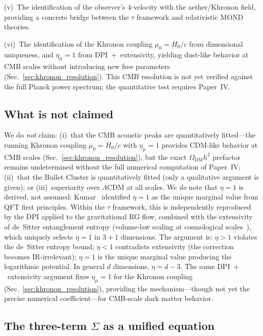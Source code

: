\documentclass[prd,twocolumn,superscriptaddress,longbibliography,floatfix]{revtex4-2}
\newcommand{\tauasym}{\tau}
\begin{document}
(v)~The identification of the observer's 4-velocity with the
aether/Khronon field, providing a concrete bridge between the
$\tauasym$ framework and relativistic MOND theories.

(vi)~The identification of the Khronon coupling
$\mu_0 = H_0/c$ from dimensional uniqueness, and $\eta_\mu = 1$
from DPI~$+$~extensivity, yielding dust-like behavior at CMB
scales without introducing new free parameters
(Sec.~\ref{sec:khronon_resolution}).  This CMB resolution
is not yet verified against the full Planck power spectrum;
the quantitative test requires Paper~IV.

\subsection{What is not claimed}

We do \emph{not} claim: (i)~that the CMB acoustic peaks
are quantitatively fitted---the running Khronon coupling
$\mu_0 = H_0/c$ with $\eta_\mu = 1$ provides CDM-like
behavior at CMB scales
(Sec.~\ref{sec:khronon_resolution}), but the exact
$\Omega_{\mathrm{DM}} h^2$ prefactor remains undetermined
without the full numerical computation of Paper~IV;
(ii)~that the Bullet Cluster is quantitatively fitted (only
a qualitative argument is given); or (iii)~superiority over
$\Lambda$CDM at all scales.
We \emph{do} note that $\eta = 1$ is derived, not assumed:
Kumar~\cite{Kumar2025} identified $\eta = 1$ as the unique
marginal value from QFT first principles.  Within the
$\tauasym$ framework, this is independently reproduced by
the DPI applied to the gravitational RG flow, combined with
the extensivity of de~Sitter entanglement entropy (volume-law
scaling at cosmological scales~\cite{Verlinde2016}), which
uniquely selects $\eta = 1$ in $3+1$ dimensions.
The argument is: $\eta > 1$ violates the de~Sitter entropy
bound; $\eta < 1$ contradicts extensivity (the correction
becomes IR-irrelevant); $\eta = 1$ is the unique marginal
value producing the logarithmic potential.
In general $d$ dimensions, $\eta = d - 3$.
The same DPI~$+$~extensivity argument fixes
$\eta_\mu = 1$ for the Khronon coupling
(Sec.~\ref{sec:khronon_resolution}), providing the
mechanism---though not yet the precise numerical
coefficient---for CMB-scale dark matter behavior.

\subsection{The three-term $\Sigma$ as a unified equation}
\end{document}
